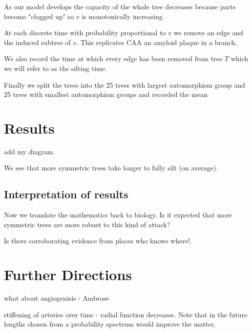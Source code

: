 \documentclass[12pt]{article} %
\theoremstyle{definition}
\begin{document}
As our model develops the capacity of the whole tree decreases because parts become "clogged up" so $v$ is 
monotonically increasing.

At each discrete time with probability proportional to $v$ we remove an edge and the induced subtree of 
$v$. This replicates CAA an amyloid plaque in a branch.  

We also record the time at which every edge has been removed from tree $T$ which we will refer to as the 
silting time.

Finally we split the trees into the 25 trees with largest automorphism group and 25 trees with smallest automorphism groups
and recorded the mean 

\section{Results}  
add my diagram.

We see that more symmetric trees take longer to fully silt (on average).  
\subsection{Interpretation of results}

Now we translate the mathematics back to biology.  Is it expected that more symmetric trees are more 
robust to this kind of attack?

Is there corroborating evidence from places who knows where!.

\section{Further Directions}
what about angiogenisis  - Ambrose


stiffening of arteries over time  - radial function decreases.
Note that in the future lengths chosen from a probability spectrum would improve the matter.   




\end{document}
